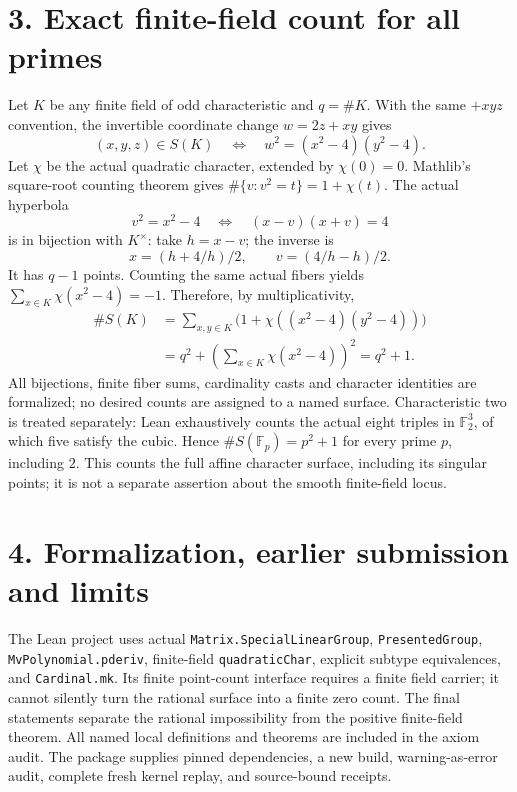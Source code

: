 \documentclass[10pt]{article}
\begin{document}
\section*{3. Exact finite-field count for all primes}
Let $K$ be any finite field of odd characteristic and $q=\#K$. With the same $+xyz$ convention, the invertible coordinate change $w=2z+xy$ gives
\[
 (x,y,z)\in S(K)\quad\Longleftrightarrow\quad
 w^2=(x^2-4)(y^2-4).
\]
Let $\chi$ be the actual quadratic character, extended by $\chi(0)=0$. Mathlib's square-root counting theorem gives $\#\{v:v^2=t\}=1+\chi(t)$. The actual hyperbola
\[
 v^2=x^2-4\quad\Longleftrightarrow\quad (x-v)(x+v)=4
\]
is in bijection with $K^\times$: take $h=x-v$; the inverse is
\[
 x=(h+4/h)/2,\qquad v=(4/h-h)/2.
\]
It has $q-1$ points. Counting the same actual fibers yields
$\sum_{x\in K}\chi(x^2-4)=-1$. Therefore, by multiplicativity,
\begin{align*}
 \#S(K)
 &=\sum_{x,y\in K}\bigl(1+\chi((x^2-4)(y^2-4))\bigr)\\
 &=q^2+\left(\sum_{x\in K}\chi(x^2-4)\right)^2=q^2+1.
\end{align*}
All bijections, finite fiber sums, cardinality casts and character identities are formalized; no desired counts are assigned to a named surface. Characteristic two is treated separately: Lean exhaustively counts the actual eight triples in $\mathbb F_2^3$, of which five satisfy the cubic. Hence $\#S(\mathbb F_p)=p^2+1$ for every prime $p$, including $2$. This counts the full affine character surface, including its singular points; it is not a separate assertion about the smooth finite-field locus.

\section*{4. Formalization, earlier submission and limits}
The Lean project uses actual \texttt{Matrix.SpecialLinearGroup}, \texttt{PresentedGroup}, \texttt{MvPolynomial.pderiv}, finite-field \texttt{quadraticChar}, explicit subtype equivalences, and \texttt{Cardinal.mk}. Its finite point-count interface requires a finite field carrier; it cannot silently turn the rational surface into a finite zero count. The final statements separate the rational impossibility from the positive finite-field theorem. All named local definitions and theorems are included in the axiom audit. The package supplies pinned dependencies, a new build, warning-as-error audit, complete fresh kernel replay, and source-bound receipts.
\end{document}
